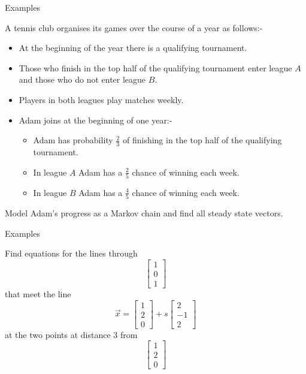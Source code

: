 \documentclass{beamer}
\begin{document}
\begin{frame}{Examples}
\begin{example}
	 A tennis club organises its games over the course of a year as follows:-
  \begin{itemize}
    \item At the beginning of the year there is a qualifying tournament.
    \item Those who finish in the top half of the qualifying tournament enter league $A$ and those who do not enter league $B$.
    \item Players in both leagues play matches weekly.
    \item Adam joins at the beginning of one year:-
    \begin{itemize}
      \item Adam has probability $\frac{2}{3}$ of finishing in the top half of the qualifying tournament.
      \item In league $A$ Adam has a $\frac{2}{5}$ chance of winning each week.
      \item In league $B$ Adam has a $\frac{4}{5}$ chance of winning each week.
    \end{itemize}
  \end{itemize}
  Model Adam's progress as a Markov chain and find all steady state vectors.
\end{example}
\end{frame}

\begin{frame}{Examples}
\begin{example}
	Find equations for the lines through
	\begin{equation*}
	\left[
	\begin{matrix}
	1\\
	0\\
	1
	\end{matrix}
	\right]
	\end{equation*}
	that meet the line
	\begin{equation*}
	\vec{x} = \left[
	\begin{matrix}
	1\\
	2\\
	0
	\end{matrix}
	\right]+s \left[
	\begin{matrix}
	2\\
	-1\\
	2
	\end{matrix}
	\right]
	\end{equation*}
	at the two points at distance $3$ from 
	\begin{equation*}
	\left[
	\begin{matrix}
	1\\
	2\\
	0
	\end{matrix}
	\right]
	\end{equation*}
\end{example}
\end{frame}
\end{document}
